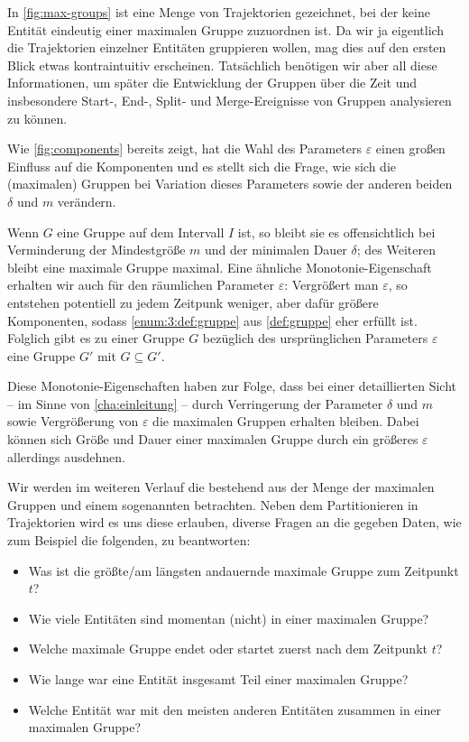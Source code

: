 In \cref{fig:max-groups} ist eine Menge von Trajektorien gezeichnet, bei der keine Entität eindeutig einer maximalen Gruppe zuzuordnen ist.
Da wir ja eigentlich die Trajektorien einzelner Entitäten gruppieren wollen, mag dies auf den ersten Blick etwas kontraintuitiv erscheinen.
Tatsächlich benötigen wir aber all diese Informationen, um später die Entwicklung der Gruppen über die Zeit und insbesondere Start-, End-, Split- und Merge-Ereignisse von Gruppen analysieren zu können.

Wie \cref{fig:components} bereits zeigt, hat die Wahl des Parameters $\varepsilon$ einen großen Einfluss auf die Komponenten und es stellt sich die Frage, wie sich die (maximalen) Gruppen bei Variation dieses Parameters sowie der anderen beiden $\delta$ und $m$ verändern.

Wenn $G$ eine Gruppe auf dem Intervall $I$ ist, so bleibt sie es offensichtlich bei Verminderung der Mindestgröße $m$ und der minimalen Dauer $\delta$; des Weiteren bleibt eine maximale Gruppe maximal.
Eine ähnliche Monotonie-Eigenschaft erhalten wir auch für den räumlichen Parameter $\varepsilon$:
Vergrößert man $\varepsilon$, so entstehen potentiell zu jedem Zeitpunk weniger, aber dafür größere Komponenten, sodass \cref{enum:3:def:gruppe} aus \cref{def:gruppe} eher erfüllt ist.
Folglich gibt es zu einer Gruppe $G$ bezüglich des ursprünglichen Parameters $\varepsilon$ eine Gruppe $G'$ mit $G \subseteq G'$.

Diese Monotonie-Eigenschaften haben zur Folge, dass bei einer detaillierten Sicht -- im Sinne von \cref{cha:einleitung} -- durch Verringerung der Parameter $\delta$ und $m$ sowie Vergrößerung von $\varepsilon$ die maximalen Gruppen erhalten bleiben.
Dabei können sich Größe und Dauer einer maximalen Gruppe durch ein größeres $\varepsilon$ allerdings ausdehnen.

Wir werden im weiteren Verlauf die \bet{\GrpStruktur} bestehend aus der Menge der maximalen Gruppen und einem sogenannten  betrachten.
Neben dem Partitionieren in Trajektorien wird es uns diese \GrpStruktur erlauben, diverse Fragen an die gegeben Daten, wie zum Beispiel die folgenden, zu beantworten:
\begin{itemize}
	\item Was ist die größte/am längsten andauernde maximale Gruppe zum Zeitpunkt $t$?
	\item Wie viele Entitäten sind momentan (nicht) in einer maximalen Gruppe?
	\item Welche maximale Gruppe endet oder startet zuerst nach dem Zeitpunkt $t$?
	\item Wie lange war eine Entität insgesamt Teil einer maximalen Gruppe?
	\item Welche Entität war mit den meisten anderen Entitäten zusammen in einer maximalen Gruppe?
\end{itemize}

